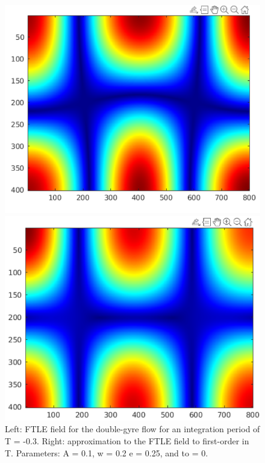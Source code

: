 \documentclass[../report.tex]{subfiles}
\begin{document}
\begin{figure}[H]
  \centering
  \begin{minipage}{.5\textwidth}
      \centering
      \includegraphics[width=\linewidth]{images/image_3-2.png}
  \end{minipage}%
  \begin{minipage}{0.5\textwidth}
      \centering
      \includegraphics[width=\linewidth]{images/image_3-1.png}
  \end{minipage}
  \caption{Left: FTLE field for the double-gyre flow for an integration period of T = -0.3. Right: approximation to the FTLE field to first-order in T. Parameters: A = 0.1, w = 0.2 e = 0.25, and to = 0.}
  \label{fig:fig_3}
\end{figure}
\end{document}

